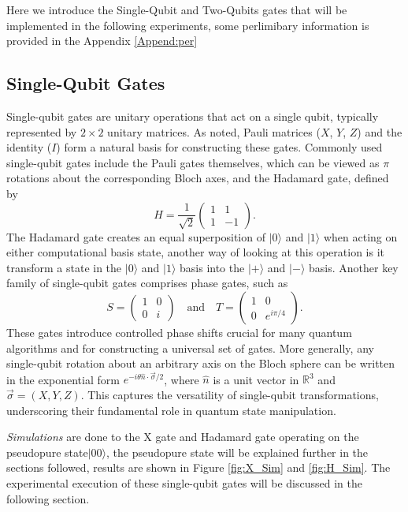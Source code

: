 \documentclass[%
 reprint,
 amsmath,amssymb,
 aps,
]{revtex4-2}
\begin{document}
Here we introduce the Single-Qubit and Two-Qubits gates that will be implemented in the following experiments, some perlimibary information is provided in the Appendix \ref{Append:per}

\subsection{Single-Qubit Gates}
Single-qubit gates are unitary operations that act on a single qubit, typically represented by $2 \times 2$ unitary matrices. As noted, Pauli matrices ($X$, $Y$, $Z$) and the identity ($I$) form a natural basis for constructing these gates. Commonly used single-qubit gates include the Pauli gates themselves, which can be viewed as $\pi$ rotations about the corresponding Bloch axes, and the Hadamard gate, defined by
\[
H = \frac{1}{\sqrt{2}}
\begin{pmatrix}
1 & 1 \\
1 & -1
\end{pmatrix}.
\]
The Hadamard gate creates an equal superposition of $\lvert 0 \rangle$ and $\lvert 1 \rangle$ when acting on either computational basis state, another way of looking at this operation is it transform a state in the $|0\rangle$ and $|1\rangle$ basis into the $|+\rangle$ and $|-\rangle$ basis. Another key family of single-qubit gates comprises phase gates, such as
\[
S = 
\begin{pmatrix}
1 & 0 \\
0 & i
\end{pmatrix}
\quad \text{and} \quad
T = 
\begin{pmatrix}
1 & 0 \\
0 & e^{i \pi/4}
\end{pmatrix}.
\]
These gates introduce controlled phase shifts crucial for many quantum algorithms and for constructing a universal set of gates. More generally, any single-qubit rotation about an arbitrary axis on the Bloch sphere can be written in the exponential form $e^{-i \theta \hat{n}\cdot\vec{\sigma}/2}$, where $\hat{n}$ is a unit vector in $\mathbb{R}^3$ and $\vec{\sigma} = (X, Y, Z)$. This captures the versatility of single-qubit transformations, underscoring their fundamental role in quantum state manipulation.

\emph{Simulations} are done to the X gate and Hadamard gate operating on the pseudopure state$|00\rangle$, the pseudopure state will be explained further in the sections followed, results are shown in Figure \ref{fig:X_Sim} and \ref{fig:H_Sim}. The experimental execution of these single-qubit gates will be discussed in the following section.
\end{document}

